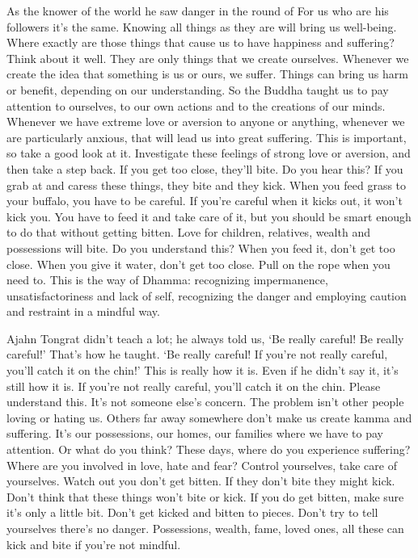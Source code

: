 As the knower of the world he saw danger in the round of  For us who are his followers it's the same. Knowing all things as they are will bring us well-being. Where exactly are those things that cause us to have happiness and suffering? Think about it well. They are only things that we create ourselves. Whenever we create the idea that something is us or ours, we suffer. Things can bring us harm or benefit, depending on our understanding. So the Buddha taught us to pay attention to ourselves, to our own actions and to the creations of our minds. Whenever we have extreme love or aversion to anyone or anything, whenever we are particularly anxious, that will lead us into great suffering. This is important, so take a good look at it. Investigate these feelings of strong love or aversion, and then take a step back. If you get too close, they'll bite. Do you hear this? If you grab at and caress these things, they bite and they kick. When you feed grass to your buffalo, you have to be careful. If you're careful when it kicks out, it won't kick you. You have to feed it and take care of it, but you should be smart enough to do that without getting bitten. Love for children, relatives, wealth and possessions will bite. Do you understand this? When you feed it, don't get too close. When you give it water, don't get too close. Pull on the rope when you need to. This is the way of Dhamma: recognizing impermanence, unsatisfactoriness and lack of self, recognizing the danger and employing caution and restraint in a mindful way.

Ajahn Tongrat didn't teach a lot; he always told us, `Be really careful! Be really careful!' That's how he taught. `Be really careful! If you're not really careful, you'll catch it on the chin!' This is really how it is. Even if he didn't say it, it's still how it is. If you're not really careful, you'll catch it on the chin. Please understand this. It's not someone else's concern. The problem isn't other people loving or hating us. Others far away somewhere don't make us create kamma and suffering. It's our possessions, our homes, our families where we have to pay attention. Or what do you think? These days, where do you experience suffering? Where are you involved in love, hate and fear? Control yourselves, take care of yourselves. Watch out you don't get bitten. If they don't bite they might kick. Don't think that these things won't bite or kick. If you do get bitten, make sure it's only a little bit. Don't get kicked and bitten to pieces. Don't try to tell yourselves there's no danger. Possessions, wealth, fame, loved ones, all these can kick and bite if you're not mindful.


